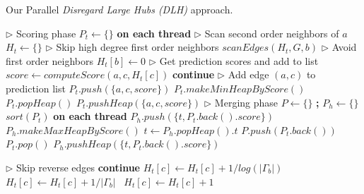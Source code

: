 \begin{algorithm}[hbtp]
\caption{Our Parallel \textit{Disregard Large Hubs (DLH)} approach.}
\label{alg:predict}
\begin{algorithmic}[1]

\Statex

 \label{alg:predict--begin}
  \State $\rhd$ Scoring phase
  \State $P_t \gets \{\}$ \textbf{on each thread} \label{alg:predict--scoring-begin}
    \State $\rhd$ Scan second order neighbors of $a$
    \State $H_t \gets \{\}$
      \State $\rhd$ Skip high degree first order neighbors
       $scanEdges(H_t, G, b)$
      \EndIf
    \EndFor
    \State $\rhd$ Avoid first order neighbors
     $H_t[b] \gets 0$ \label{alg:predict--avoid-neighbors1}
    \EndFor
    \State $\rhd$ Get prediction scores and add to list
      \State $score \gets computeScore(a, c, H_t[c])$
       \textbf{continue}
      \EndIf
      \State $\rhd$ Add edge $(a, c)$ to prediction list
        \State $P_t.push(\{a, c, score\})$
         $P_t.makeMinHeapByScore()$
        \EndIf
        \State $P_t.popHeap()$
        \State $P_t.pushHeap(\{a, c, score\})$
      \EndIf
    \EndFor
  \EndFor \label{alg:predict--scoring-end}
  \State $\rhd$ Merging phase \label{alg:predict--merging-begin}
  \State $P \gets \{\}$ \textbf{;} $P_h \gets \{\}$
  \State $sort(P_t)$ \textbf{on each thread}
     $P_h.push(\{t, P_t.back().score\})$
    \EndIf
  \EndFor
  \State $P_h.makeMaxHeapByScore()$ 
   \label{alg:predict--merge-loop-begin}
    \State $t \gets P_h.popHeap().t$
    \State $P.push(P_t.back())$
    \State $P_t.pop()$
     $P_h.pushHeap(\{t, P_t.back().score\})$
    \EndIf
  \EndWhile \label{alg:predict--merging-end}
\EndFunction \label{alg:predict--end}

\Statex

 \label{alg:predict--scan-begin}
    \State $\rhd$ Skip reverse edges
     \textbf{continue}
    \EndIf
     $H_t[c] \gets H_t[c] + 1 / log(|\Gamma_b|)$
     $H_t[c] \gets H_t[c] + 1 / |\Gamma_b|$
    \Else\ $H_t[c] \gets H_t[c] + 1$
    \EndIf
  \EndFor
\EndFunction \label{alg:predict--scan-end}
\end{algorithmic}
\end{algorithm}

